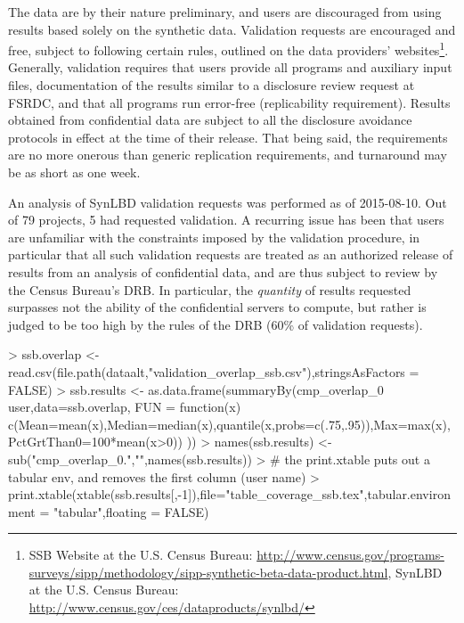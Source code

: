 The data are by their nature preliminary, and users are discouraged from using results based
solely on the synthetic data. Validation requests are encouraged and free, subject to following
certain rules, outlined on the data providers' websites\footnote{\acf{SSB} Website at the U.S.
Census Bureau:
\url{http://www.census.gov/programs-surveys/sipp/methodology/sipp-synthetic-beta-data-product.html},
 \acf{SynLBD} at the U.S. Census Bureau:
\url{http://www.census.gov/ces/dataproducts/synlbd/}}. Generally, validation requires that
users provide all programs and auxiliary input files, documentation of the results similar to a
disclosure review request at \ac{FSRDC}, and that all programs run error-free
(replicability requirement). Results obtained from confidential data are subject to all the
disclosure avoidance protocols in effect at the time of their release. That being said, the
requirements are no more onerous than generic replication requirements, and turnaround may
be as short as one week.

An analysis of \ac{SynLBD} validation requests was performed as of 2015-08-10. Out of 79 projects, 5 had requested validation. A recurring issue has been that users are unfamiliar with the constraints imposed by the validation procedure, in particular that all such validation requests are treated as an authorized release of results from an analysis of confidential data, and are thus subject to review by the Census Bureau's \ac{DRB}. In particular, the \emph{quantity} of results requested surpasses not the ability of the confidential servers to compute, but rather is judged to be too high by the rules of the \ac{DRB} (60\% of validation requests).




\begin{Schunk}
\begin{Sinput}
> ssb.overlap <- read.csv(file.path(dataalt,"validation_overlap_ssb.csv"),stringsAsFactors = FALSE)
> ssb.results <- as.data.frame(summaryBy(cmp_overlap_0 ~ user,data=ssb.overlap, FUN = function(x) {c(Mean=mean(x),Median=median(x),quantile(x,probs=c(.75,.95)),Max=max(x),PctGrtThan0=100*mean(x>0))} ))
> names(ssb.results) <- sub("cmp_overlap_0.","",names(ssb.results))
> # the print.xtable puts out a tabular env, and removes the first column (user name)
> print.xtable(xtable(ssb.results[,-1]),file="table_coverage_ssb.tex",tabular.environment = "tabular",floating = FALSE)
\end{Sinput}
\end{Schunk}


